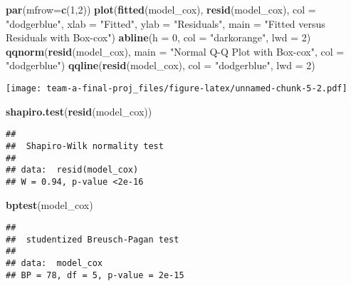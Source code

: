 \documentclass[]{article}
\newenvironment{Shaded}{\begin{snugshade}}{\end{snugshade}}
\newcommand{\DataTypeTok}[1]{\textcolor[rgb]{0.13,0.29,0.53}{#1}}
\newcommand{\DecValTok}[1]{\textcolor[rgb]{0.00,0.00,0.81}{#1}}
\newcommand{\KeywordTok}[1]{\textcolor[rgb]{0.13,0.29,0.53}{\textbf{#1}}}
\newcommand{\NormalTok}[1]{#1}
\newcommand{\StringTok}[1]{\textcolor[rgb]{0.31,0.60,0.02}{#1}}
\begin{document}
\begin{Shaded}
\begin{Highlighting}[]
\KeywordTok{par}\NormalTok{(}\DataTypeTok{mfrow=}\KeywordTok{c}\NormalTok{(}\DecValTok{1}\NormalTok{,}\DecValTok{2}\NormalTok{))}
\KeywordTok{plot}\NormalTok{(}\KeywordTok{fitted}\NormalTok{(model_cox), }\KeywordTok{resid}\NormalTok{(model_cox), }\DataTypeTok{col =} \StringTok{"dodgerblue"}\NormalTok{, }
     \DataTypeTok{xlab =} \StringTok{"Fitted"}\NormalTok{, }\DataTypeTok{ylab =} \StringTok{"Residuals"}\NormalTok{, }\DataTypeTok{main =} \StringTok{"Fitted versus Residuals with Box-cox"}\NormalTok{)}
\KeywordTok{abline}\NormalTok{(}\DataTypeTok{h =} \DecValTok{0}\NormalTok{, }\DataTypeTok{col =} \StringTok{"darkorange"}\NormalTok{, }\DataTypeTok{lwd =} \DecValTok{2}\NormalTok{)}
\KeywordTok{qqnorm}\NormalTok{(}\KeywordTok{resid}\NormalTok{(model_cox), }\DataTypeTok{main =} \StringTok{"Normal Q-Q Plot with Box-cox"}\NormalTok{, }\DataTypeTok{col =} \StringTok{"dodgerblue"}\NormalTok{)}
\KeywordTok{qqline}\NormalTok{(}\KeywordTok{resid}\NormalTok{(model_cox), }\DataTypeTok{col =} \StringTok{"dodgerblue"}\NormalTok{, }\DataTypeTok{lwd =} \DecValTok{2}\NormalTok{)}
\end{Highlighting}
\end{Shaded}

\texttt{[image: team-a-final-proj\_files/figure-latex/unnamed-chunk-5-2.pdf]}

\begin{Shaded}
\begin{Highlighting}[]
\KeywordTok{shapiro.test}\NormalTok{(}\KeywordTok{resid}\NormalTok{(model_cox))}
\end{Highlighting}
\end{Shaded}

\begin{verbatim}
## 
##  Shapiro-Wilk normality test
## 
## data:  resid(model_cox)
## W = 0.94, p-value <2e-16
\end{verbatim}

\begin{Shaded}
\begin{Highlighting}[]
\KeywordTok{bptest}\NormalTok{(model_cox)}
\end{Highlighting}
\end{Shaded}

\begin{verbatim}
## 
##  studentized Breusch-Pagan test
## 
## data:  model_cox
## BP = 78, df = 5, p-value = 2e-15
\end{verbatim}
\end{document}
